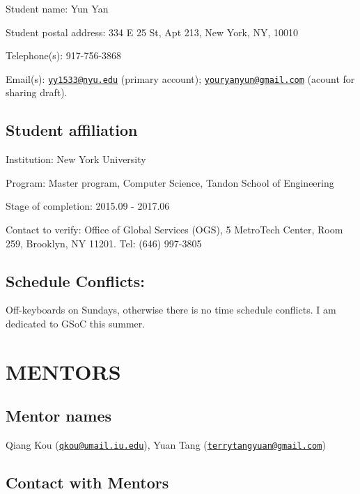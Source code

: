 \documentclass[]{article}
\begin{document}
Student name: Yun Yan

Student postal address: 334 E 25 St, Apt 213, New York, NY, 10010

Telephone(s): 917-756-3868

Email(s): \href{mailto:yy1533@nyu.edu}{\nolinkurl{yy1533@nyu.edu}}
(primary account);
\href{mailto:youryanyun@gmail.com}{\nolinkurl{youryanyun@gmail.com}}
(acount for sharing draft).

\subsection{Student affiliation}\label{student-affiliation}

Institution: New York University

Program: Master program, Computer Science, Tandon School of Engineering

Stage of completion: 2015.09 - 2017.06

Contact to verify: Office of Global Services (OGS), 5 MetroTech Center,
Room 259, Brooklyn, NY 11201. Tel: (646) 997-3805

\subsection{Schedule Conflicts:}\label{schedule-conflicts}

Off-keyboards on Sundays, otherwise there is no time schedule conflicts.
I am dedicated to GSoC this summer.

\section{MENTORS}\label{mentors}

\subsection{Mentor names}\label{mentor-names}

Qiang Kou
(\href{mailto:qkou@umail.iu.edu}{\nolinkurl{qkou@umail.iu.edu}}), Yuan Tang
(\href{mailto:terrytangyuan@gmail.com}{\nolinkurl{terrytangyuan@gmail.com}})

\subsection{Contact with Mentors}\label{contact-with-mentors}
\end{document}
